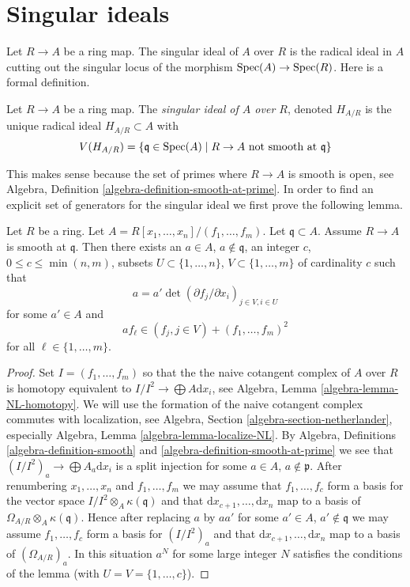 \section{Singular ideals}
\label{section-singular-ideal}

\noindent
Let $R \to A$ be a ring map. The singular ideal of $A$ over $R$
is the radical ideal in $A$ cutting out the singular locus of the
morphism $\mathop{\rm Spec}(A) \to \mathop{\rm Spec}(R)$. Here is a formal definition.

\begin{definition}
\label{definition-singular-ideal}
Let $R \to A$ be a ring map. The {\it singular ideal of $A$ over $R$},
denoted $H_{A/R}$ is the unique radical ideal $H_{A/R} \subset A$ with
$$
V(H_{A/R}) = \{\mathfrak q \in \mathop{\rm Spec}(A) \mid R \to A
\text{ not smooth at }\mathfrak q\}
$$
\end{definition}

\noindent
This makes sense because the set of primes where $R \to A$ is smooth
is open, see
Algebra, Definition \ref{algebra-definition-smooth-at-prime}.
In order to find an explicit set
of generators for the singular ideal we first prove the following lemma.

\begin{lemma}
\label{lemma-find-strictly-standard}
Let $R$ be a ring. Let $A = R[x_1, \ldots, x_n]/(f_1, \ldots, f_m)$.
Let $\mathfrak q \subset A$. Assume $R \to A$ is smooth
at $\mathfrak q$. Then there exists an $a \in A$, $a \not \in \mathfrak q$,
an integer $c$, $0 \leq c \leq \min(n, m)$, subsets
$U \subset \{1, \ldots, n\}$, $V \subset \{1, \ldots, m\}$
of cardinality $c$ such that
$$
a = a' \det(\partial f_j/\partial x_i)_{j \in V, i \in U}
$$
for some $a' \in A$ and
$$
a f_\ell \in (f_j, j \in V) + (f_1, \ldots, f_m)^2
$$
for all $\ell \in \{1, \ldots, m\}$.
\end{lemma}

\begin{proof}
Set $I = (f_1, \ldots, f_m)$ so that the the naive cotangent
complex of $A$ over $R$ is homotopy equivalent to
$I/I^2 \to \bigoplus A\text{d}x_i$, see
Algebra, Lemma \ref{algebra-lemma-NL-homotopy}.
We will use the formation of the naive cotangent complex commutes with
localization, see Algebra, Section \ref{algebra-section-netherlander},
especially Algebra, Lemma \ref{algebra-lemma-localize-NL}.
By Algebra, Definitions \ref{algebra-definition-smooth} and
\ref{algebra-definition-smooth-at-prime}
we see that $(I/I^2)_a \to \bigoplus A_a\text{d}x_i$
is a split injection for some $a \in A$, $a \not \in \mathfrak p$.
After renumbering $x_1, \ldots, x_n$ and $f_1, \ldots, f_m$ we may
assume that $f_1, \ldots, f_c$ form a basis for
the vector space $I/I^2 \otimes_A \kappa(\mathfrak q)$ and that
$\text{d}x_{c + 1}, \ldots, \text{d}x_n$ map to a basis of
$\Omega_{A/R} \otimes_A \kappa(\mathfrak q)$. Hence after replacing $a$
by $aa'$ for some $a' \in A$, $a' \not \in \mathfrak q$ we may assume
$f_1, \ldots, f_c$ form a basis for $(I/I^2)_a$ and that
$\text{d}x_{c + 1}, \ldots, \text{d}x_n$ map to a basis of
$(\Omega_{A/R})_a$. In this situation $a^N$ for some large integer
$N$ satisfies the conditions of the lemma (with $U = V = \{1, \ldots, c\}$).
\end{proof}

